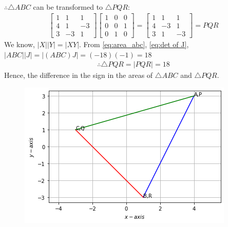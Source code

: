 \documentclass[journal,12pt,twocolumn]{IEEEtran}
\renewcommand\thesection{\arabic{section}}
\begin{document}
\begin{enumerate}[label=\thesection.\arabic*.,ref=\thesection.\theenumi]
\begin{align}
\end{align}
$\therefore\triangle ABC$ can be transformed to $\triangle PQR$:
\begin{align}
\begin{bmatrix}
1 & 1 & 1 \\ 
4 & 1 & -3\\ 
3 & -3 & 1
\end{bmatrix}\begin{bmatrix}
1 & 0 & 0\\ 
0 & 0 & 1\\ 
0 & 1 & 0 
\end{bmatrix}=\begin{bmatrix}
1 & 1 & 1\\ 
4 & -3 & 1\\ 
3 & 1 & -3
\end{bmatrix}=PQR
\end{align}
We know, $\left | X \right |\left | Y \right |=\left | XY \right |$. From \eqref{eq:area_abc}, \eqref{eq:det of J}, \\
$\left | ABC \right |\left | J \right |=\left | (ABC)J \right |=(-18)(-1)=18$
\label{eq:area_pqr}
\begin{align}
\therefore\triangle PQR=\left | PQR \right |=18
\end{align}
Hence, the difference in the sign in the areas of $\triangle ABC$ and $\triangle PQR$.\\
\begin{figure}[!ht]
	\centering
	\includegraphics[scale=0.5]{triangle.png}
\end{figure}
\end{enumerate}
\end{document}
